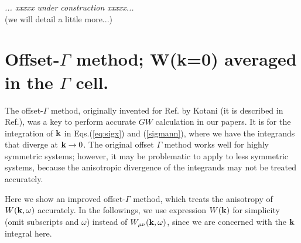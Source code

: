 \documentclass[a4paper,10pt,fleqn]{article}
\def\underconstruction{{\it... xxxxx under construction xxxxx...\\}}
\newcommand{\bfq}{{\bf q}}
\newcommand{\bfk}{{\bf k}}
\newcommand{\req}[1]{\mbox{Eq.~(\ref{#1})}}
\begin{document}
\underconstruction(we will detail a little more...)

\section{Offset-$\Gamma$ method; W(k=0) averaged in the $\Gamma$ cell.}
\label{sec:kint}
The offset-$\Gamma$ method, originally 
invented for Ref.\cite{kotani_all-electron_2002} by Kotani 
(it is described in Ref.\cite{kotani_quasiparticle_2007}), 
was a key to perform accurate $GW$ 
calculation in our papers.
It is for the integration of $\bfk$ 
in Eqs.(\ref{eq:sigx}) and (\ref{sigmann}), where
we have the integrands that diverge at $\bfk \to 0$.
The original offset $\Gamma$ method works well 
for highly symmetric systems; however,
it may be problematic to apply to less symmetric systems, 
because the anisotropic divergence of the integrands 
may not be treated accurately.

Here we show an improved offset-$\Gamma$ method, which treats
the anisotropy of $W(\bfk,\omega)$ accurately.
In the followings, we use expression $W(\bfk)$
for simplicity (omit subscripts and $\omega$)
instead of $W_{\mu \nu}(\bfk,\omega)$, 
since we are concerned with the $\bfk$ integral here.

\end{document}
